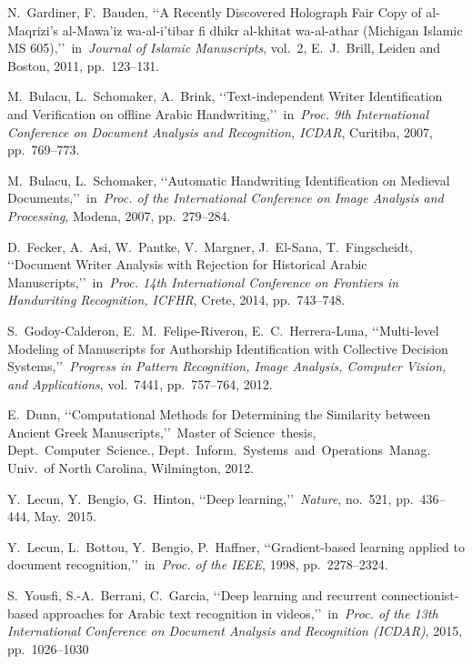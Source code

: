 \documentclass[conference]{IEEEtran}
\begin{document}
 \begin{thebibliography}{1}

 N.~Gardiner, F.~Bauden, \lq\lq A Recently Discovered Holograph Fair Copy of al-Maqrizi's al-Mawa'iz wa-al-i'tibar fi dhikr al-khitat wa-al-athar (Michigan Islamic MS 605),\rq\rq~in~\emph{Journal of Islamic Manuscripts}, vol.~2, E.~J.~Brill, Leiden and Boston, 2011, pp.~123--131.

 M.~Bulacu, L.~Schomaker, A.~Brink, \lq\lq Text-independent Writer Identification and Verification on offline Arabic Handwriting,\rq\rq~in~\emph{Proc. 9th International Conference on Document Analysis and Recognition, ICDAR}, Curitiba, 2007, pp.~769--773.

 M.~Bulacu, L.~Schomaker, \lq\lq Automatic Handwriting Identification on Medieval Documents,\rq\rq~in~\emph{Proc. of the International Conference on Image Analysis and Processing}, Modena, 2007, pp.~279--284.

 D.~Fecker, A.~Asi, W.~Pantke, V.~Margner, J.~El-Sana, T.~Fingscheidt, \lq\lq Document Writer Analysis with Rejection for Historical Arabic Manuscripts,\rq\rq~in~\emph{Proc. 14th International Conference on Frontiers in Handwriting Recognition, ICFHR}, Crete, 2014, pp.~743--748.

 S.~Godoy-Calderon, E.~M.~Felipe-Riveron, E.~C.~Herrera-Luna, \lq\lq Multi-level Modeling of Manuscripts for Authorship Identification with Collective Decision Systems,\rq\rq~\emph{Progress in Pattern Recognition, Image Analysis, Computer Vision, and Applications}, vol.~7441, pp.~757--764, 2012.

 E.~Dunn, \lq\lq Computational Methods for Determining the Similarity between Ancient Greek Manuscripts,\rq\rq~Master of Science~thesis, Dept.~Computer~Science., Dept.~Inform.~Systems~and~Operations~Manag. Univ.~of North Carolina, Wilmington, 2012.

 Y.~Lecun, Y.~Bengio, G.~Hinton, \lq\lq Deep learning,\rq\rq~\emph{Nature}, no.~521, pp.~436--444, May.~2015.

 Y.~Lecun, L.~Bottou, Y.~Bengio, P.~Haffner, \lq\lq Gradient-based learning applied to document recognition,\rq\rq~in~\emph{Proc. of the IEEE}, 1998, pp.~2278--2324.

 S.~Yousfi, S.-A.~Berrani, C.~Garcia, \lq\lq Deep learning and recurrent connectionist-based approaches for Arabic text recognition in videos,\rq\rq~in~\emph{Proc. of the 13th International Conference on Document Analysis and Recognition (ICDAR)}, 2015, pp.~1026--1030


\end{thebibliography}
\end{document}
